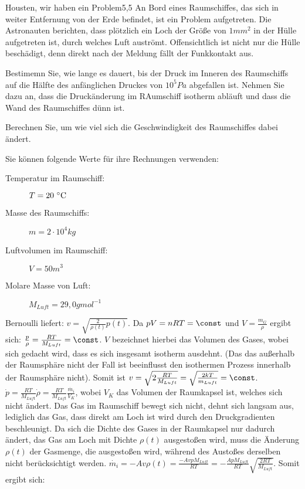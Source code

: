 \begin{problem}{Housten, wir haben ein Problem}{5,5}
An Bord eines Raumschiffes, das sich in weiter Entfernung von der Erde befindet, ist ein Problem aufgetreten.  Die Astronauten berichten, dass plötzlich ein Loch der Größe von $1\unit{mm^2}$ in der Hülle aufgetreten ist, durch welches Luft auströmt.  Offensichtlich ist nicht nur die Hülle beschädigt, denn direkt nach der Meldung fällt der Funkkontakt aus.
\begin{abcenum}
  \item Bestimemn Sie, wie lange es dauert, bis der Druck im Inneren des Raumschiffs auf die Hälfte des anfänglichen Druckes von $10^5\unit{Pa}$ abgefallen ist.  Nehmen Sie dazu an, dass die Druckänderung im RAumschiff isotherm abläuft und dass die Wand des Raumschiffes dünn ist.
  \item Berechnen Sie, um wie viel sich die Geschwindigkeit des Raumschiffes dabei ändert.
\end{abcenum}
Sie können folgende Werte für ihre Rechnungen verwenden:
\begin{description}
\item[Temperatur im Raumschiff:] $T=20\,\mathrm{\,^\circ\mathrm{C}}$
\item[Masse des Raumschiffs:] $m=2\cdot 10^4\unit{kg}$
\item[Luftvolumen im Raumschiff:] $V=50\unit{m^3}$
\item[Molare Masse von Luft:] $M_{Luft}=29,0\unit{g mol^{-1}}$
\end{description}
\begin{solution}
\begin{abcenum}
\item
  Bernoulli liefert: $v=\sqrt{\frac{2}{\rho(t)}p(t)}$.  Da $pV=nRT=\const$ und $V=\frac{m_G}{\rho}$ ergibt sich: $\frac{p}{\rho}=\frac{RT}{M_{Luft}}=\const$. $V$ bezeichnet hierbei das Volumen des Gases, wobei sich gedacht wird, dass es sich insgesamt isotherm ausdehnt. (Das das außerhalb der Raumsphäre nicht der Fall ist beeinflusst den isothermen Prozess innerhalb der Raumsphäre nicht).  Somit ist $v=\sqrt{2\frac{RT}{M_{Luft}}}=\sqrt{\frac{2kT}{m_{Luft}}}=\const$.  $\dot{p}=\frac{RT}{M_{Luft}}\dot{\rho}=\frac{RT}{M_{Luft}}\frac{\dot{m_i}}{V_K}$, wobei $V_K$ das Volumen der Raumkapsel ist, welches sich nicht ändert.  Das Gas im Raumschiff bewegt sich nicht, dehnt sich langsam aus, lediglich das Gas, dass direkt am Loch ist wird durch den Druckgradienten beschleunigt.  Da sich die Dichte des Gases in der Raumkapsel nur dadurch ändert, das Gas am Loch mit Dichte $\rho(t)$ ausgestoßen wird, muss die Änderung $\rho(t)$ der Gasmenge, die ausgestoßen wird, während des Austoßes derselben nicht berücksichtigt werden.  $\dot{m_i}=-Av\rho(t)=\frac{-AvpM_{Luft}}{RT}=-\frac{ApM_{Luft}}{RT}\sqrt{\frac {2RT}{M_{Luft}}}$.  Somit ergibt sich:


\end{abcenum}
\end{solution}
\end{problem}
